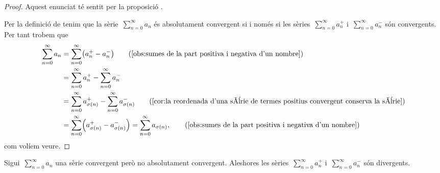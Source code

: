 \documentclass[../../main.tex]{subfiles}
\begin{document}
    \begin{proof}
        Aquest enunciat té sentit per la proposició .

        Per la definició de  tenim que la sèrie~\(\sum_{n=0}^{\infty}a_{n}\) és absolutament convergent si i només si les sèries~\(\sum_{n=0}^{\infty}a^{+}_{n}\) i~\(\sum_{n=0}^{\infty}a^{-}_{n}\) són convergents.
        Per tant trobem que
        \begin{align*}
            \sum_{n=0}^{\infty}a_{n}&=\sum_{n=0}^{\infty}\left(a^{+}_{n}-a^{-}_{n}\right) \tag{\ref{obs:sumes de la part positiva i negativa d'un nombre}}\\
            &=\sum_{n=0}^{\infty}a^{+}_{n}-\sum_{n=0}^{\infty}a^{-}_{n} \\
            &=\sum_{n=0}^{\infty}a^{+}_{\sigma(n)}-\sum_{n=0}^{\infty}a^{-}_{\sigma(n)} \tag{\ref{cor:la reordenada d'una sèrie de termes positius convergent conserva la sèrie}}\\
            &=\sum_{n=0}^{\infty}\left(a^{+}_{\sigma(n)}-a^{-}_{\sigma(n)}\right)=\sum_{n=0}^{\infty}a_{\sigma(n)}, \tag{\ref{obs:sumes de la part positiva i negativa d'un nombre}}
        \end{align*}
        com volíem veure.
    \end{proof}
    \begin{lemma}
        \label{lema:Teorema de la reordenació de sèries de Riemann}
        Sigui~\(\sum_{n=0}^{\infty}a_{n}\) una sèrie convergent però no absolutament convergent.
        Aleshores les sèries~\(\sum_{n=0}^{\infty}a^{+}_{n}\) i~\(\sum_{n=0}^{\infty}a^{-}_{n}\) són divergents.
    \end{lemma}
\end{document}
